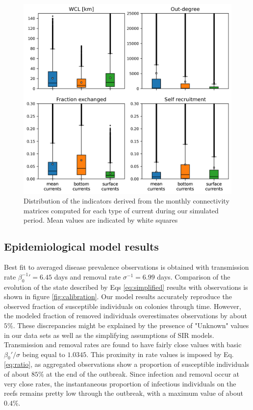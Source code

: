 \documentclass[utf8]{frontiersSCNS}
\begin{document}
\begin{figure}
    \centering
    \includegraphics[width=.8\textwidth]{figures/connect_paper.png}
    \caption{Distribution of the indicators derived from the monthly connectivity matrices computed for each type of current during our simulated period. Mean values are indicated by white squares}
    \label{fig:connect}
\end{figure}

\subsection{Epidemiological model results}

Best fit to averaged disease prevalence observations is obtained with transmission rate $\beta_0^{-1}'=6.45$ days and removal rate $\sigma^{-1}=6.99$ days. Comparison of the evolution of the state described by Eqs \ref{eq:simplified} results with observations is shown in figure \ref{fig:calibration}. Our model results accurately reproduce the observed fraction of susceptible individuals on colonies through time. However, the modeled fraction of removed individuals overestimates observations by about $5\%$. These discrepancies might be explained by the presence of "Unknown" values in our data sets as well as the simplifying assumptions of SIR models. Transmission and removal rates are found to have fairly close values with basic  $\beta_0'/\sigma$ being equal to $1.0345$. This proximity in rate values is imposed by Eq. \ref{eq:ratio}, as aggregated observations show a proportion of susceptible individuals of about $85\%$ at the end of the outbreak. Since infection and removal occur at very close rates, the instantaneous proportion of infectious individuals on the reefs remains pretty low through the outbreak, with a maximum value of about $0.4\%$.
\end{document}
